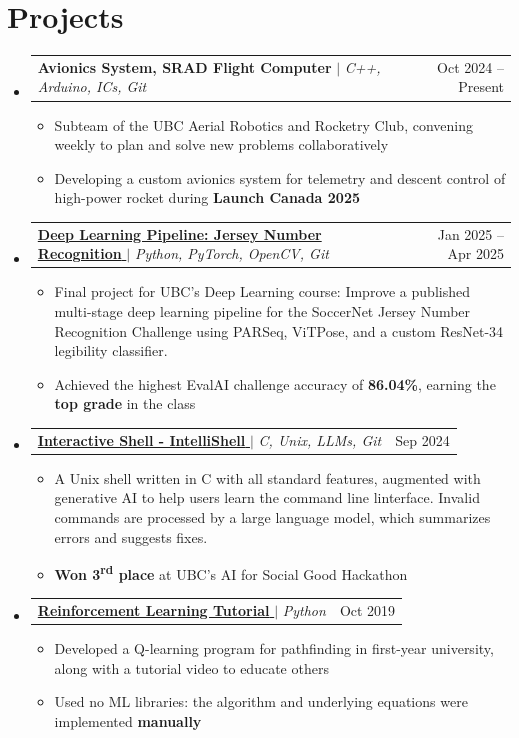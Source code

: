 \documentclass[letterpaper,10pt]{article}
\makeatletter
\newcommand{\resumeProjectItem}[1]{
  \item\footnotesize{
    {#1 \vspace{-1.5pt}}
  }
}
\newcommand{\resumeProjectHeading}[2]{
    \item
    \begin{tabular*}{0.97\textwidth}{l@{\extracolsep{\fill}}r}
      \small#1 & #2 \\
    \end{tabular*}\vspace{-7pt}
}
\newcommand{\resumeSubHeadingListStart}{\begin{itemize}[leftmargin=0.15in, label={}]}
\newcommand{\resumeSubHeadingListEnd}{\end{itemize}}
\newcommand{\resumeItemListStart}{\begin{itemize}}
\newcommand{\resumeItemListEnd}{\end{itemize}\vspace{-5pt}}
\def\iconSpace{0.5pt}
\def\projectSpaceBefore{1pt}
\makeatother
\begin{document}
\section{Projects}
    \resumeSubHeadingListStart
      \resumeProjectHeading
          {\textbf{Avionics System, SRAD Flight Computer} $|$ \textit{C++, Arduino, ICs, Git}}{Oct 2024 -- Present}
          \resumeItemListStart
            \vspace{\projectSpaceBefore}
            \resumeProjectItem{Subteam of the UBC Aerial Robotics and Rocketry Club, convening weekly to plan and solve new problems collaboratively}
            \resumeProjectItem{Developing a custom avionics system for telemetry and descent control of high-power rocket during \textbf{Launch Canada 2025}}
          \resumeItemListEnd
      \resumeProjectHeading
          {\href{https://github.com/rileyeaton-ubc/COSC519-Jersey-Number-Recognition}{\textbf{Deep Learning Pipeline: Jersey Number Recognition} \faGithub} \hspace{\iconSpace}$|$ \textit{Python, PyTorch, OpenCV, Git}}{Jan 2025 -- Apr 2025}
          \resumeItemListStart
            \vspace{\projectSpaceBefore}
            \resumeProjectItem{Final project for UBC's Deep Learning course: Improve a published multi-stage deep learning pipeline for the SoccerNet Jersey Number Recognition Challenge using PARSeq, ViTPose, and a custom ResNet-34 legibility classifier.}
            \resumeProjectItem{Achieved the highest EvalAI challenge accuracy of \textbf{86.04\%}, earning the \textbf{top grade} in the class}
          \resumeItemListEnd
      \resumeProjectHeading
          {\href{https://github.com/rileyeaton-ubc/intellishell-ai-hackathon}{\textbf{Interactive Shell - IntelliShell} \faGithub} \hspace{\iconSpace}$|$ \textit{C, Unix, LLMs, Git}}{Sep 2024}
          \resumeItemListStart
            \vspace{\projectSpaceBefore}
            \resumeProjectItem{A Unix shell written in C with all standard features, augmented with generative AI to help users learn the command line linterface. Invalid commands are processed by a large language model, which summarizes errors and suggests fixes.}
            \resumeProjectItem{\textbf{Won 3\textsuperscript{rd} place} at UBC's AI for Social Good Hackathon}
          \resumeItemListEnd
      \resumeProjectHeading
          {\href{https://youtu.be/e59wArs9kp4}{\textbf{Reinforcement Learning Tutorial} \faYoutubePlay} \hspace{\iconSpace}$|$ \textit{Python}}{Oct 2019}
          \resumeItemListStart
            \vspace{\projectSpaceBefore}
            \resumeProjectItem{Developed a Q-learning program for pathfinding in first-year university, along with a tutorial video to educate others}
            \resumeProjectItem{Used no ML libraries: the algorithm and underlying equations were implemented \textbf{manually}}
          \resumeItemListEnd
    \resumeSubHeadingListEnd
\end{document}
